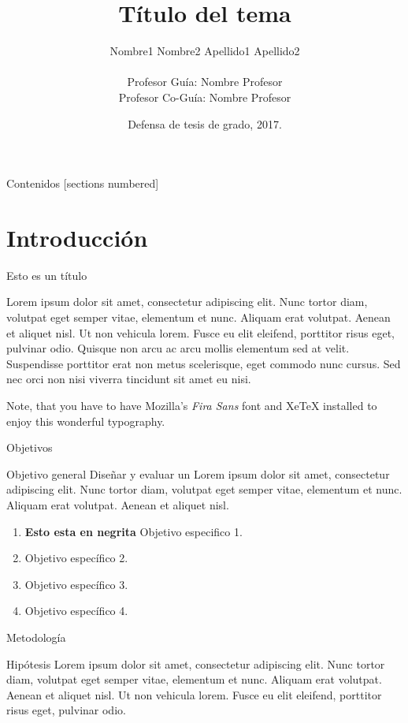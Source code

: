 \documentclass[10pt]{beamer}
\title{Título del tema}
\date{Defensa de tesis de grado, 2017.}
\author{Nombre1 Nombre2 Apellido1 Apellido2\inst{1} \\ \\ Profesor Guía: Nombre Profesor\\ Profesor Co-Guía: Nombre Profesor}
\institute
{
\inst{1}%
Departamento de Ingeniería Informática\\
Universidad de Santiago de Chile
}
\begin{document}
\maketitle

\begin{frame}{Contenidos}
  [sections numbered]
  \tableofcontents[hideallsubsections]
\end{frame}


\section{Introducción}

\begin{frame}[fragile]{Esto es un título}

Lorem ipsum dolor sit amet, consectetur adipiscing elit. Nunc tortor diam, volutpat eget semper vitae, elementum et nunc. Aliquam erat volutpat. Aenean et aliquet nisl. Ut non vehicula lorem. Fusce eu elit eleifend, porttitor risus eget, pulvinar odio. Quisque non arcu ac arcu mollis elementum sed at velit. Suspendisse porttitor erat non metus scelerisque, eget commodo nunc cursus. Sed nec orci non nisi viverra tincidunt sit amet eu nisi.

Note, that you have to have Mozilla's \emph{Fira Sans} font and XeTeX
installed to enjoy this wonderful typography.
\end{frame}

\begin{frame}[fragile]{Objetivos}
      \begin{block}{Objetivo general}
      Diseñar y evaluar un Lorem ipsum dolor sit amet, consectetur adipiscing elit. Nunc tortor diam, volutpat eget semper vitae, elementum et nunc. Aliquam erat volutpat. Aenean et aliquet nisl.
      \end{block}
      \begin{enumerate}
        \item \textbf{Esto esta en negrita} Objetivo especifico 1.
        \item Objetivo específico 2.
        \item Objetivo específico 3.
        \item Objetivo específico 4.
\end{enumerate}
\end{frame}

\begin{frame}[fragile]{Metodología}
      \begin{exampleblock}{Hipótesis}
      Lorem ipsum dolor sit amet, consectetur adipiscing elit. Nunc tortor diam, volutpat eget semper vitae, elementum et nunc. Aliquam erat volutpat. Aenean et aliquet nisl. Ut non vehicula lorem. Fusce eu elit eleifend, porttitor risus eget, pulvinar odio.
      \end{exampleblock}

\end{frame}
\end{document}
